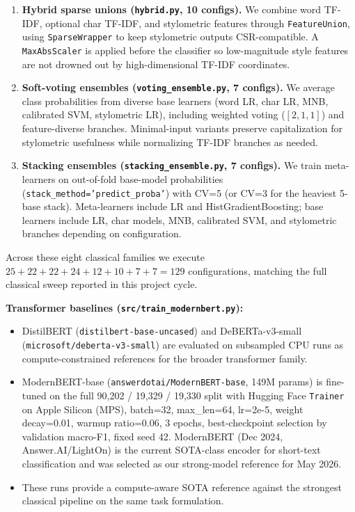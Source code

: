 \documentclass[10pt]{article}
\begin{document}
\begin{enumerate}
    \item \textbf{Hybrid sparse unions (\texttt{hybrid.py}, 10 configs).}
    We combine word TF-IDF, optional char TF-IDF, and stylometric features through \texttt{FeatureUnion}, using \texttt{SparseWrapper} to keep stylometric outputs CSR-compatible. A \texttt{MaxAbsScaler} is applied before the classifier so low-magnitude style features are not drowned out by high-dimensional TF-IDF coordinates.

    \item \textbf{Soft-voting ensembles (\texttt{voting\_ensemble.py}, 7 configs).}
    We average class probabilities from diverse base learners (word LR, char LR, MNB, calibrated SVM, stylometric LR), including weighted voting (\([2,1,1]\)) and feature-diverse branches. Minimal-input variants preserve capitalization for stylometric usefulness while normalizing TF-IDF branches as needed.

    \item \textbf{Stacking ensembles (\texttt{stacking\_ensemble.py}, 7 configs).}
    We train meta-learners on out-of-fold base-model probabilities (\texttt{stack\_method='predict\_proba'}) with CV=5 (or CV=3 for the heaviest 5-base stack). Meta-learners include LR and HistGradientBoosting; base learners include LR, char models, MNB, calibrated SVM, and stylometric branches depending on configuration.
\end{enumerate}

Across these eight classical families we execute \(25+22+22+24+12+10+7+7=129\) configurations, matching the full classical sweep reported in this project cycle.

\textbf{Transformer baselines (\texttt{src/train\_modernbert.py}):}
\begin{itemize}
    \item DistilBERT (\texttt{distilbert-base-uncased}) and DeBERTa-v3-small (\texttt{microsoft/deberta-v3-small}) are evaluated on subsampled CPU runs as compute-constrained references for the broader transformer family.
    \item ModernBERT-base (\texttt{answerdotai/ModernBERT-base}, 149M params) is fine-tuned on the full 90,202 / 19,329 / 19,330 split with Hugging Face \texttt{Trainer} on Apple Silicon (MPS), batch=32, max\_len=64, lr=2e-5, weight decay=0.01, warmup ratio=0.06, 3 epochs, best-checkpoint selection by validation macro-F1, fixed seed 42. ModernBERT (Dec 2024, Answer.AI/LightOn) is the current SOTA-class encoder for short-text classification and was selected as our strong-model reference for May 2026.
    \item These runs provide a compute-aware SOTA reference against the strongest classical pipeline on the same task formulation.
\end{itemize}
\end{document}
